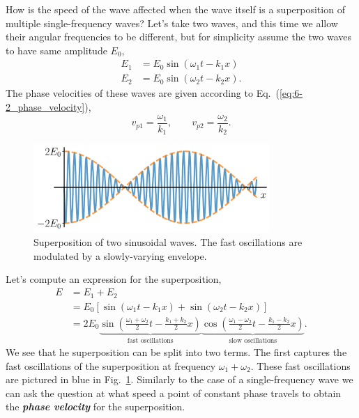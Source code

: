 How is the speed of the wave affected when the wave itself is a superposition of multiple single-frequency waves?
Let's take two waves, and this time we allow their angular frequencies to be different, but for simplicity assume the two waves to have same amplitude $E_0$,
\begin{align}
    E_1 & = E_0 \sin \left(\omega_1 t-k_1 x\right) \\
    E_2 & = E_0 \sin \left(\omega_2 t-k_2 x\right).
\end{align}
The phase velocities of these waves are given according to Eq.~(\ref{eq:6-2_phase_velocity}),
\begin{equation}
    v_{p1} = \frac{\omega_1}{k_1}, \qquad v_{p2} = \frac{\omega_2}{k_2}.
\end{equation}
\begin{figure}[t]
   \centering
    \includegraphics[width=0.8\textwidth]{lesson6/6-2_superpostion_velocity.pdf}    
        \caption[Group velocity]{Superposition of two sinusoidal waves. The fast oscillations are modulated by a slowly-varying envelope.}
        \label{fig:6-2_superposition}
\end{figure}
Let's compute an expression for the superposition,
\begin{align} 
    E & = E_{1} + E_{2} \nonumber\\
     & = E_{0}\left[\sin \left(\omega_{1} t-k_{1} x\right)+\sin \left(\omega_{2} t-k_{2} x\right)\right] \nonumber\\
    & = 2 E_{0} \underbrace{\sin \left( \frac{\omega_{1}+\omega_{2}}{2} t-\frac{k_{1}+k_{2}}{2} x \right)}_{\text{fast oscillations}} \underbrace{ \cos \left( \frac{\omega_{1}-\omega_{2}}{2} t-\frac{k_{1}-k_{2}}{2} x \right)}_{\text{slow oscillations}}.
\end{align}
We see that he superposition can be split into two terms.
The first captures the fast oscillations of the superposition at frequency $\omega_1+\omega_2$.
These fast oscillations are pictured in blue in Fig.~\ref{fig:6-2_superposition}.
Similarly to the case of a single-frequency wave we can ask the question at what speed a point of constant phase travels to obtain the \textit{\textbf{phase velocity}} for the superposition.

